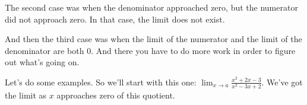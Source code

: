 \documentclass[pdftex, brazil, 12pt, twoside]{article}
\begin{document}
The second case was when the denominator approached zero,
but the numerator did not approach zero.
In that case, the limit does not exist.

\begin{figure}[H]
  \begin{center}
  \end{center}
\end{figure}

And then the third case was when the limit
of the numerator and the limit of the denominator are both $0$.
And there you have to do more work in order
to figure out what's going on.

\begin{figure}[H]
  \begin{center}
  \end{center}
\end{figure}

Let's do some examples.
So we'll start with this one: $\displaystyle \lim_{x \to a}\frac{x^2+2x-3}{x^2-3x+2}$.
We've got the limit as $x$ approaches
zero of this quotient.

\begin{figure}[H]
  \begin{center}
  \end{center}
\end{figure}
\end{document}
